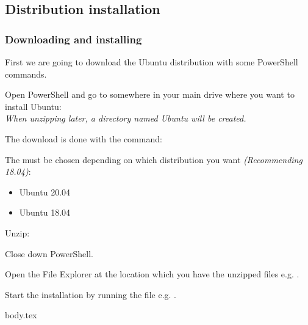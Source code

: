 \subsection{Distribution installation}

\subsubsection{Downloading and installing}
First we are going to download the Ubuntu distribution with some PowerShell commands.

Open PowerShell and go to somewhere in your main drive where you want to install Ubuntu:\\
\textit{When unzipping later, a directory named Ubuntu will be created.}\\

The download is done with the command:\\

The  must be chosen depending on which distribution you want \textit{(Recommending 18.04)}:
\begin{itemize}
    \item Ubuntu 20.04 
    \item Ubuntu 18.04 
\end{itemize}

Unzip:\\

Close down PowerShell.

Open the File Explorer at the location which you have the unzipped files e.g. .

Start the installation by running the  file e.g. .

\ifdefined\wslDistroSetup
{body.tex}
\fi